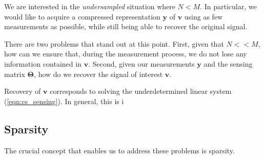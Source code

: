 We are interested in the \emph{undersampled} situation where $N < M$.
In particular, we would like to acquire a compressed representation $\bm y$ of $\bm v$ using as few measurements as possible, while still being able to recover the original signal.

There are two problems that stand out at this point. 
First, given that $N << M$, how can we ensure that, during the measurement process, we do not lose any information contained in $\bm v$.
Second, given our measurements $\bm y$ and the sensing matrix $\bm\Theta$, how do we recover the signal of interest $\bm v$.

Recovery of $\bm v$ corresponds to solving the underdetermined linear system (\ref{eqn:cs_sensing}).
In general, this is i


\subsection{Sparsity}
The crucial concept that enables us to address these problems is sparsity.







